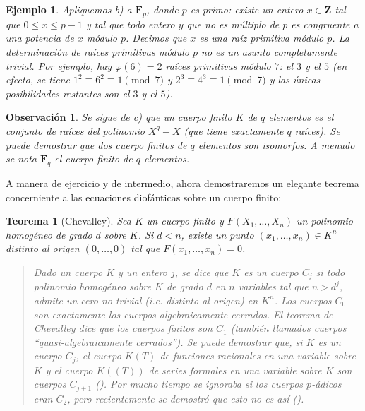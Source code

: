 \documentclass[bibtotoc,leqno,spanish]{amsbook}
\newcommand{\ZZ}{\mathbf{Z}}
\newcommand{\FF}{\mathbf{F}}
\numberwithin{equation}{section}
\newenvironment{comm}%
	{\begin{quotation}\itshape}
	{\end{quotation}}
\theoremstyle{note}
\theoremstyle{note}
\newtheorem{theorem}{Teorema}
\theoremstyle{rem}
\newtheorem*{example*}{Ejemplo}
\newtheorem*{remark*}{Observaci\'on}
\numberwithin{theorem}{section}
\numberwithin{proposition}{section}
\numberwithin{definition}{section}
\numberwithin{lemma}{section}
\numberwithin{corollary}{section}
\numberwithin{example}{section}
\numberwithin{footnote}{section}%
\begin{document}
\begin{example*}
Apliquemos b) a $\FF_{p}$, donde $p$ es primo: existe un entero $x\in\ZZ$ tal que $0\leq x\leq p-1$ y tal
que todo entero $y$ que no es m\'ultiplo de $p$ es congruente a una potencia de $x$ m\'odulo $p$. Decimos
que $x$ es {\em una ra\'iz primitiva m\'odulo $p$.} La determinaci\'on de ra\'ices primitivas m\'odulo
$p$ no es un asunto completamente trivial. Por ejemplo, hay $\varphi(6) = 2$ ra\'ices primitivas m\'odulo $7$:
el $3$ y el $5$ (en efecto, se tiene $1^{2}\equiv 6^{2}\equiv 1\pmod 7$ y $2^{3}\equiv 4^{3}\equiv 1\pmod 7$
y las \'unicas posibilidades restantes son el $3$ y el $5$).
\end{example*}

\begin{remark*}
Se sigue de c) que un cuerpo finito $K$ de $q$ elementos es el conjunto de ra\'ices del polinomio $X^{q}-X$
(que tiene exactamente $q$ ra\'ices). Se puede demostrar que dos cuerpo finitos de $q$ elementos son isomorfos.
A menudo se nota $\FF_{q}$ el cuerpo finito de $q$ elementos.
\end{remark*}

A manera de ejercicio y de intermedio, ahora demostraremos un elegante teorema concerniente a las
ecuaciones diof\'anticas sobre un cuerpo finito:

\begin{theorem}[Chevalley]\label{teo1.7.2}
Sea $K$ un cuerpo finito y $F(X_{1},\dots,X_{n})$ un polinomio homog\'eneo de grado $d$ sobre $K$.
Si $d < n$, existe un punto $(x_{1},\dots,x_{n})\in K^{n}$ distinto al origen $(0,\dots,0)$ tal que
$F(x_{1},\dots,x_{n}) = 0$.
\end{theorem}

\begin{comm}
Dado un cuerpo $K$ y un entero $j$, se dice que $K$ es un {\em cuerpo} $C_{j}$ si todo polinomio
homog\'eneo sobre $K$ de grado $d$ en $n$ variables {\em tal que} $n > d^{j}$, admite un cero no
trivial (i.e. distinto al origen) en $K^{n}$. Los cuerpos $C_{0}$ son exactamente los cuerpos algebraicamente
cerrados. El teorema de Chevalley dice que los cuerpos finitos son $C_{1}$ (tambi\'en llamados
cuerpos ``quasi-algebraicamente cerrados''). Se puede demostrar que, si $K$ es un cuerpo $C_{j}$, el
cuerpo $K(T)$ de funciones racionales en una variable sobre $K$ y el cuerpo $K((T))$ de series formales
en una variable sobre $K$ son cuerpos $C_{j+1}$ (\cite{Lang}). Por mucho tiempo se ignoraba si los
cuerpos $p$-\'adicos eran $C_{2}$, pero recientemente se demostr\'o que esto no es as\'i (\cite{Terjanian}).
\end{comm}
\end{document}

